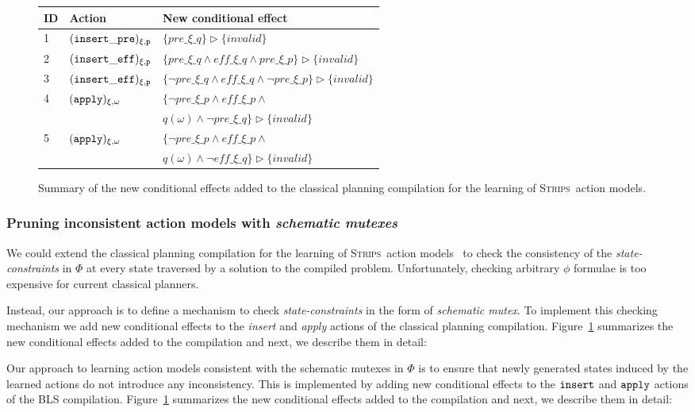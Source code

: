 \documentclass[letterpaper]{article} %
\newcommand{\strips}{\textsc{Strips}}     %
\begin{document}
\begin{figure}
	\begin{footnotesize}
		\begin{tabular}{lll}
			{\bf ID} & {\bf Action} & {\bf New conditional effect}\\\hline
			1&${\tt (insert\_pre)_{\xi,p}}$&$\{pre\_\xi\_q\}\rhd\{invalid\}$\\
			2&${\tt (insert\_eff)_{\xi,p}}$&$\{pre\_\xi\_q\wedge eff\_\xi\_q\wedge pre\_\xi\_p\}\rhd\{invalid\}$\\
			3&${\tt (insert\_eff)_{\xi,p}}$&$\{\neg pre\_\xi\_q\wedge eff\_\xi\_q\wedge \neg pre\_\xi\_p\}\rhd\{invalid\}$\\
			4&${\tt (apply)_{\xi,\omega}}$&$\{\neg pre\_\xi\_p \wedge eff\_\xi\_p \wedge $\\
			&&$q(\omega)\wedge \neg pre\_\xi\_q\}\rhd\{invalid\}$\\
			5&${\tt (apply)_{\xi,\omega}}$&$\{\neg pre\_\xi\_p \wedge eff\_\xi\_p \wedge $\\
			&&$q(\omega)\wedge \neg eff\_\xi\_q\}\rhd\{invalid\}$
		\end{tabular}
	\end{footnotesize}
	\caption{\small Summary of the new conditional effects added to the classical planning compilation for the learning of \strips\ action models.}
	\label{fig:ceffects}
\end{figure}

\subsubsection{Pruning inconsistent action models with {\em schematic mutexes}}
We could extend the classical planning compilation for the learning of \strips\ action models~\cite{aineto2018learning} to check the consistency of the {\em state-constraints} in $\Phi$ at every state traversed by a solution to the compiled problem. Unfortunately, checking arbitrary $\phi$ formulae is too expensive for current classical planners.

Instead, our approach is to define a mechanism to check {\em state-constraints} in the form of {\em schematic mutex}. To implement this checking mechanism we add new conditional effects to the {\em insert} and {\em apply} actions of the classical planning compilation. Figure~\ref{fig:ceffects} summarizes the new conditional effects added to the compilation and next, we describe them in detail:

Our approach to learning action models consistent with the schematic mutexes in $\Phi$ is to ensure that newly generated states induced by the learned actions do not introduce any inconsistency. This is implemented by adding new conditional effects to the ${\tt \small insert}$ and ${\tt\small apply}$ actions of the BLS compilation. Figure~\ref{fig:ceffects} summarizes the new conditional effects added to the compilation and next, we describe them in detail:
\end{document}
